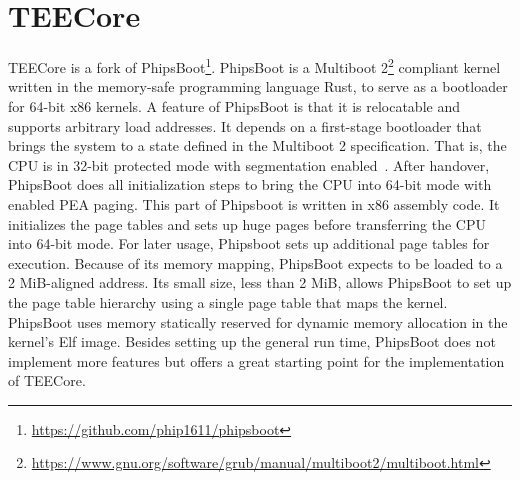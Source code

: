 \section{TEECore}
\label{sec:implementation:teeKernel}
TEECore is a fork of
PhipsBoot\footnote{\url{https://github.com/phip1611/phipsboot}}. PhipsBoot is a
Multiboot
2\footnote{\url{https://www.gnu.org/software/grub/manual/multiboot2/multiboot.html}}
compliant kernel written in the memory-safe programming language Rust, to serve
as a bootloader for 64-bit x86 kernels. A feature of PhipsBoot is that it is
relocatable and supports arbitrary load addresses. It depends on a first-stage
bootloader that brings the
system to a state defined in the Multiboot 2 specification. That is, the CPU is
in 32-bit protected mode with segmentation enabled~\cite{mb2}. After handover,
PhipsBoot does all initialization steps to bring the CPU into 64-bit mode with
enabled PEA paging. This part of Phipsboot is written in x86 assembly code. It
initializes the page tables and sets up huge pages before transferring the CPU
into 64-bit mode. For later usage, Phipsboot sets up additional page tables for
execution. Because of its memory mapping, PhipsBoot expects to be loaded to a 2
MiB-aligned address. Its small size, less than 2 MiB, allows PhipsBoot to set up
the page table hierarchy using a single page table that maps the kernel.
PhipsBoot uses memory statically reserved for dynamic memory allocation in the
kernel's Elf image. Besides setting up the general run time, PhipsBoot does not
implement more features but offers a great starting point for the implementation
of TEECore.\\

